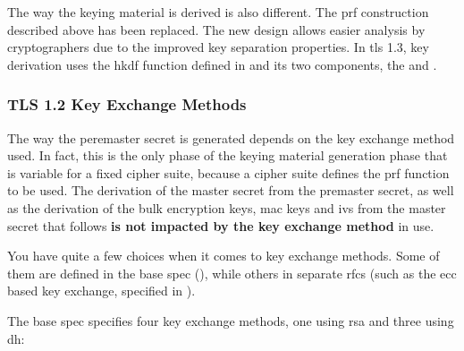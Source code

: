 \documentclass{llncs}
\begin{document}
The way the keying material is derived is also different. The
\gls{prf} construction described above has been replaced. The
new design allows easier analysis by cryptographers due to the improved
key separation properties. In \gls{tls} 1.3, key derivation uses the
\gls{hkdf} function defined in \cite{RFC5869} and its two components,
the  and .

\subsubsection{TLS 1.2 Key Exchange Methods}

The way the peremaster secret is generated depends on the key exchange
method used. In fact, this is the only phase of the keying material generation
phase that is variable for a fixed cipher suite, because a cipher suite defines
the \gls{prf} function to be used. The derivation
of the master secret from the premaster secret, as well as the
derivation of the bulk encryption keys, \gls{mac} keys and \gls{iv}s from the master secret
that follows \textbf{is not impacted by the key exchange method} in use.

You have quite a few choices when it comes to key exchange methods. Some of them
are defined in the base spec (\cite{RFC5246}), while others
in separate \gls{rfc}s (such as the \gls{ecc} based key exchange, specified
in  \cite{RFC4492}).

The base spec specifies four key exchange methods, one using \gls{rsa} and
three using \gls{dh}:
\end{document}
